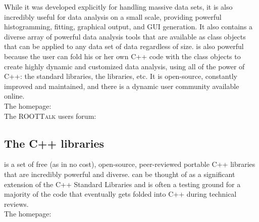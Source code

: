While it was developed explicitly for handling massive data sets, it
is also incredibly useful for data analysis on a small scale,
providing powerful histogramming, fitting, graphical output, and GUI
generation. It also contains a diverse array of powerful data analysis
tools that are available as class objects that can be applied to any
data set of data regardless of size. \ROOT is also powerful because
the user can fold his or her own C++ code with the \ROOT class objects
to create highly dynamic and customized data analysis, using all of
the power of C++: the standard libraries, the \BOOST libraries,
etc. It is open-source, constantly improved and maintained, and there
is a dynamic user community available online.\\

\noindent
The \ROOT homepage: \\

\noindent
The \textsc{ROOTTalk} users forum: \\

\subsection{The \BOOST C++ libraries}
\label{sec: boostdep}
\BOOST is a set of free (as in no cost), open-source, peer-reviewed
portable C++ libraries that are incredibly powerful and diverse.
\BOOST can be thought of as a significant extension of the C++
Standard Libraries and is often a testing ground for a majority of the
code that eventually gets folded into C++ during technical reviews.\\

\noindent
The \BOOST homepage: \\
